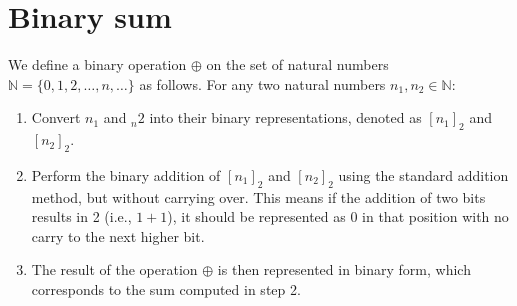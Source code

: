 \section{Binary sum}

We define a binary operation $\oplus$ on the set of natural numbers $\mathbb{N}=\{0, 1, 2, \dots, n, \dots \}$ as follows.
For any two natural numbers $n_1,n_2 \in \mathbb{N}$:
\begin{enumerate}
    \item Convert $n_1$ and $_n2$ into their binary representations, denoted as $[n_1]_2$ and $[n_2]_2$. 
    \item Perform the binary addition of  $[n_1]_2$ and $[n_2]_2$ using the standard addition method, but without carrying over.
        This means if the addition of two bits results in 2 (i.e., $1 + 1$), it should be represented as 0 in that position with no carry to the next higher bit.
    \item The result of the operation $\oplus$ is then represented in binary form, which corresponds to the sum computed in step 2.
\end{enumerate}